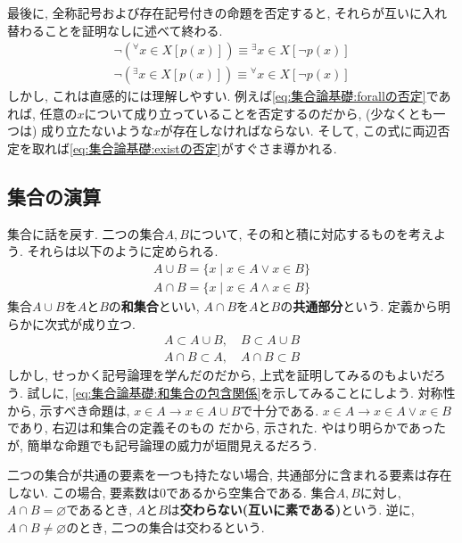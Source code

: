         最後に, 全称記号および存在記号付きの命題を否定すると, それらが互いに入れ替わることを証明なしに述べて終わる.
        \begin{align}
            \lnot\left({}^\forall x\in X \left[p(x)\right]\right) \equiv {}^\exists x\in X \left[\lnot p(x)\right] \label{eq:集合論基礎:forallの否定}\\
            \lnot\left({}^\exists x\in X \left[p(x)\right]\right) \equiv {}^\forall x\in X \left[\lnot p(x)\right] \label{eq:集合論基礎:existの否定}
        \end{align}
        しかし, これは直感的には理解しやすい. 例えば\eqref{eq:集合論基礎:forallの否定}であれば, 任意の$x$について成り立っていることを否定するのだから, (少なくとも一つは)
        成り立たないような$x$が存在しなければならない. そして, この式に両辺否定を取れば\eqref{eq:集合論基礎:existの否定}がすぐさま導かれる.
    \clearpage
    \subsection{集合の演算}
        集合に話を戻す. 二つの集合$A,B$について, その和と積に対応するものを考えよう. それらは以下のように定められる.
        \begin{align}
            A\cup B = \{x\mid x\in A \lor x \in B\} \label{eq:集合論基礎:和集合の定義}\\
            A\cap B = \{x\mid x\in A \land x \in B\} \label{eq:集合論基礎:共通部分の定義}
        \end{align}
        集合$A\cup B$を$A$と$B$の\textbf{和集合}といい, $A\cap B$を$A$と$B$の\textbf{共通部分}という. 定義から明らかに次式が成り立つ.
        \begin{align}
            A\subset A \cup B,\quad B\subset A \cup B \label{eq:集合論基礎:和集合の包含関係}\\
            A \cap B \subset A,\quad A \cap B\subset B \label{eq:集合論基礎:共通部分の包含関係}
        \end{align}
        しかし, せっかく記号論理を学んだのだから, 上式を証明してみるのもよいだろう. 試しに, \eqref{eq:集合論基礎:和集合の包含関係}を示してみることにしよう.
        対称性から, 示すべき命題は, $x\in A \rightarrow x\in A \cup B$で十分である. $x \in A \rightarrow x \in A \lor x\in B$であり, 右辺は和集合の定義そのもの
        だから, 示された. やはり明らかであったが, 簡単な命題でも記号論理の威力が垣間見えるだろう.

        二つの集合が共通の要素を一つも持たない場合, 共通部分に含まれる要素は存在しない. この場合, 要素数は0であるから空集合である. 集合$A,B$に対し, $A\cap B =\varnothing$であるとき,
        $A$と$B$は\textbf{交わらない(互いに素である)}という. 逆に, $A\cap B\neq \varnothing$のとき, 二つの集合は交わるという.\\

